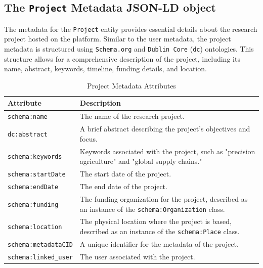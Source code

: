 \documentclass{article}
\begin{document}
\subsection{The \texttt{Project} Metadata JSON-LD object}

The metadata for the \texttt{Project} entity provides essential details about the research project hosted on the platform. Similar to the user metadata, the project metadata is structured using \texttt{Schema.org} and \texttt{Dublin Core} (\texttt{dc}) ontologies. This structure allows for a comprehensive description of the project, including its name, abstract, keywords, timeline, funding details, and location.

\begin{table}[h]
      \centering
      \label{tab:project_metadata}
      \renewcommand{\arraystretch}{1.2}
      \begin{tabularx}{\textwidth}{|l|X|}
            \hline
            \textbf{Attribute}           & \textbf{Description}                                                                                           \\ \hline
            \texttt{schema:name}         & The name of the research project.                                                                              \\ \hline
            \texttt{dc:abstract}         & A brief abstract describing the project's objectives and focus.                                                \\ \hline
            \texttt{schema:keywords}     & Keywords associated with the project, such as "precision agriculture" and "global supply chains."              \\ \hline
            \texttt{schema:startDate}    & The start date of the project.                                                                                 \\ \hline
            \texttt{schema:endDate}      & The end date of the project.                                                                                   \\ \hline
            \texttt{schema:funding}      & The funding organization for the project, described as an instance of the \texttt{schema:Organization} class.  \\ \hline
            \texttt{schema:location}     & The physical location where the project is based, described as an instance of the \texttt{schema:Place} class. \\ \hline
            \texttt{schema:metadataCID}  & A unique identifier for the metadata of the project.                                                           \\ \hline
            \texttt{schema:linked\_user} & The user associated with the project.                                                                          \\ \hline
      \end{tabularx}
      \caption{Project Metadata Attributes}
\end{table}
\end{document}
